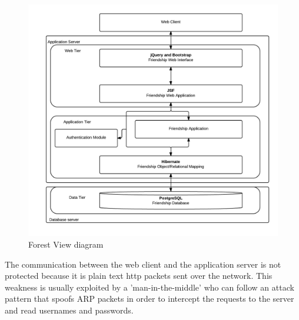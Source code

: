 \documentclass[a4paper]{article}
\begin{document}
\begin{figure}[h!]
\centering
\includegraphics[scale=0.35]{ForestView}
\caption{Forest View diagram}
\label{fig:forest_view}
\end{figure}

The communication between the web client and the application server is not protected \cite{sins2009} because it is plain text http packets sent over the network. This weakness is usually exploited by a 'man-in-the-middle' who can follow an attack pattern that spoofs ARP packets in order to intercept the requests to the server and read usernames and passwords.
\end{document}
